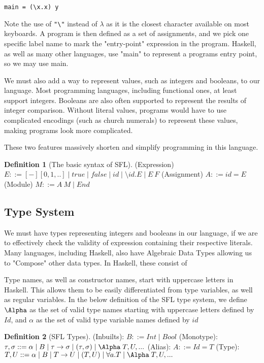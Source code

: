 \documentclass[
author=Kiran Sturt,
degree=BSc,
title=Implementing a Step by Step Evaluator for a Simple Functional Programming language,
unit=COMS30045,twoside]{dissertation}
\theoremstyle{definition}
\theoremstyle{break}
\newtheorem{syntax}{Definition}
\theoremstyle{definition}
\begin{document}
\begin{lstlisting}[]
main = (\x.x) y
\end{lstlisting}

Note the use of \verb|"\"| instead of \(\lambda\) as it is the closest character available on most keyboards. A program is then defined as a set of assignments, and we pick one specific label name to mark the "entry-point" expression in the program. Haskell, as well as many other languages, use "main" to represent a programs entry point, so we may use main. 

We must also add a way to represent values, such as integers and booleans, to our language. Most programming languages, including functional ones, at least support integers. Booleans are also often supported to represent the results of integer comparison. Without literal values, programs would have to use complicated encodings (such as church numerals) to represent these values, making programs look more complicated. 

These two features massively shorten and simplify programming in this language.

\begin{syntax}[The basic syntax of SFL]
(Expression) \(E ::= [-][0, 1, ..] \mid true \mid false \mid id \mid \setminus id. E \mid E\:F\)\newline
(Assignment) \(A ::= id = E\)\newline
(Module) \(M ::= A\: M \mid End\)
\end{syntax}

\subsection{Type System}
We must have types representing integers and booleans in our language, if we are to effectively check the validity of expression containing their respective literals. Many languages, including Haskell, also have Algebraic Data Types allowing us to "Compose" other data types. In Haskell, these consist of 

Type names, as well as constructor names, start with uppercase letters in Haskell. This allows them to be easily differentiated from type variables, as well as regular variables. 
In the below definition of the SFL type system, we define \(\Alpha\) as the set of valid type names starting with uppercase letters defined by \(Id\), and \(\alpha\) as the set of valid type variable names defined by \(id\)

\begin{syntax}[SFL Types]
(Inbuilts): \(B::=Int\mid Bool\)\newline
(Monotype): \(\tau, \sigma ::= \alpha \mid B \mid \tau \rightarrow \sigma \mid (\tau, \sigma) \mid \Alpha \;T, U,...\)\newline
(Alias): \(A ::= Id = T\)\newline
(Type): \(T, U ::= \alpha \mid B \mid T \rightarrow U \mid (T, U) \mid \forall a. T \mid \Alpha \;T, U,...\)

\end{syntax}
\end{document}
